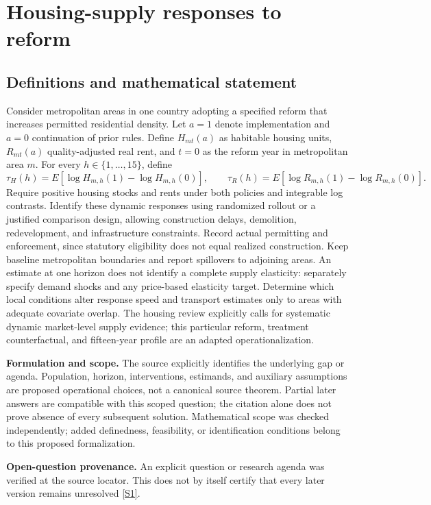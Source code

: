 \documentclass[11pt]{article}
\newcommand{\sref}[2]{\hyperlink{source:#1:#2}{[S#2]}}
\begin{document}
\section*{Housing-supply responses to reform}\label{30007742}
\subsection{Definitions and mathematical statement}
Consider metropolitan areas in one country adopting a specified reform that increases permitted residential density. Let \(a=1\) denote implementation and \(a=0\) continuation of prior rules. Define \(H_{mt}(a)\) as habitable housing units, \(R_{mt}(a)\) quality-adjusted real rent, and \(t=0\) as the reform year in metropolitan area \(m\). For every \(h\in\{1,\ldots,15\}\), define
\[\tau_H(h)=E[\log H_{m,h}(1)-\log H_{m,h}(0)],\qquad\tau_R(h)=E[\log R_{m,h}(1)-\log R_{m,h}(0)].\]
Require positive housing stocks and rents under both policies and integrable log contrasts. Identify these dynamic responses using randomized rollout or a justified comparison design, allowing construction delays, demolition, redevelopment, and infrastructure constraints. Record actual permitting and enforcement, since statutory eligibility does not equal realized construction. Keep baseline metropolitan boundaries and report spillovers to adjoining areas. An estimate at one horizon does not identify a complete supply elasticity: separately specify demand shocks and any price-based elasticity target. Determine which local conditions alter response speed and transport estimates only to areas with adequate covariate overlap. The housing review explicitly calls for systematic dynamic market-level supply evidence; this particular reform, treatment counterfactual, and fifteen-year profile are an adapted operationalization.

\par\textbf{Formulation and scope.} The source explicitly identifies the underlying gap or agenda. Population, horizon, interventions, estimands, and auxiliary assumptions are proposed operational choices, not a canonical source theorem. Partial later answers are compatible with this scoped question; the citation alone does not prove absence of every subsequent solution. Mathematical scope was checked independently; added definedness, feasibility, or identification conditions belong to this proposed formalization.

\par\textbf{Open-question provenance.} An explicit question or research agenda was verified at the source locator. This does not by itself certify that every later version remains unresolved \sref{30007742}{1}.
\end{document}
